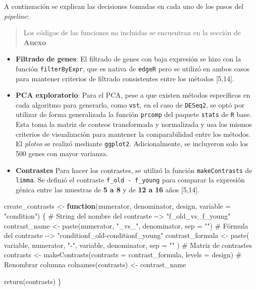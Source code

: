 \documentclass[
  12pt,
  letterpaper,
  DIV=11,
  numbers=noendperiod]{scrartcl}
\newenvironment{Shaded}{\begin{snugshade}}{\end{snugshade}}
\newcommand{\AttributeTok}[1]{\textcolor[rgb]{0.40,0.45,0.13}{#1}}
\newcommand{\CommentTok}[1]{\textcolor[rgb]{0.37,0.37,0.37}{#1}}
\newcommand{\ControlFlowTok}[1]{\textcolor[rgb]{0.00,0.23,0.31}{\textbf{#1}}}
\newcommand{\FunctionTok}[1]{\textcolor[rgb]{0.28,0.35,0.67}{#1}}
\newcommand{\NormalTok}[1]{\textcolor[rgb]{0.00,0.23,0.31}{#1}}
\newcommand{\OtherTok}[1]{\textcolor[rgb]{0.00,0.23,0.31}{#1}}
\newcommand{\StringTok}[1]{\textcolor[rgb]{0.13,0.47,0.30}{#1}}
\begin{document}
A continuación se explican las decisiones tomadas en cada uno de los
pasos del \emph{pipeline}:

\begin{quote}
Los códigos de las funciones no incluidas se encuentran en la sección de
\textbf{Anexo}
\end{quote}

\begin{itemize}
\item
  \textbf{Filtrado de genes}: El filtrado de genes con baja expresión se
  hizo con la función \texttt{filterByExpr}, que es nativa de
  \texttt{edgeR} pero se utilizó en ambos casos para mantener criterios
  de filtrado consistentes entre los métodos {[}5,14{]}.
\item
  \textbf{PCA exploratorio}: Para el PCA, pese a que existen métodos
  específicos en cada algoritmo para generarlo, como \texttt{vst}, en el
  caso de \texttt{DESeq2}, se optó por utilizar de forma generalizada la
  función \texttt{prcomp} del paquete \texttt{stats} de \texttt{R} base.
  Esta toma la matriz de conteos transformada y normalizada y usa los
  mismos criterios de visualización para mantener la comparabilidad
  entre los métodos. El \emph{ploteo} se realizó mediante
  \texttt{ggplot2}. Adicionalmente, se incluyeron solo los 500 genes con
  mayor varianza.
\item
  \textbf{Contrastes} Para hacer los contrastes, se utilizó la función
  \texttt{makeContrasts} de \texttt{limma}. Se definió el contraste
  \texttt{f\_old\ -\ f\_young} para comparar la expresión génica entre
  las muestras de \textbf{5 a 8} y de \textbf{12 a 16} años {[}5,14{]}.
\end{itemize}

\begin{Shaded}
\begin{Highlighting}[]
\NormalTok{create\_contrasts }\OtherTok{\textless{}{-}} \ControlFlowTok{function}\NormalTok{(numerator, denominator, design, }\AttributeTok{variable =} \StringTok{"condition"}\NormalTok{) \{}
  \CommentTok{\# String del nombre del contraste {-}{-}\textgreater{} "f\_old\_vs\_f\_young"}
\NormalTok{  contrast\_name }\OtherTok{\textless{}{-}} \FunctionTok{paste}\NormalTok{(numerator, }\StringTok{"\_vs\_"}\NormalTok{, denominator, }\AttributeTok{sep =} \StringTok{""}\NormalTok{)}
  \CommentTok{\# Fórmula del contraste {-}{-}\textgreater{} "conditionf\_old{-}conditionf\_young"}
\NormalTok{  contrast\_formula }\OtherTok{\textless{}{-}} \FunctionTok{paste}\NormalTok{(}
\NormalTok{    variable, numerator, }\StringTok{"{-}"}\NormalTok{, variable, denominator, }\AttributeTok{sep =} \StringTok{""}
\NormalTok{  )}
  \CommentTok{\# Matriz de contrastes}
\NormalTok{  contrasts }\OtherTok{\textless{}{-}} \FunctionTok{makeContrasts}\NormalTok{(}\AttributeTok{contrasts =}\NormalTok{ contrast\_formula, }\AttributeTok{levels =}\NormalTok{ design)}
  \CommentTok{\# Renombrar columna}
  \FunctionTok{colnames}\NormalTok{(contrasts) }\OtherTok{\textless{}{-}}\NormalTok{ contrast\_name}

  \FunctionTok{return}\NormalTok{(contrasts)}
\NormalTok{\}}
\end{Highlighting}
\end{Shaded}
\end{document}
